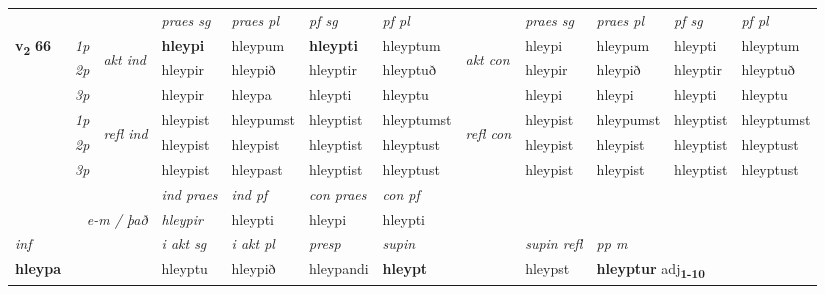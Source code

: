 \begin{longtable}[l]{X>{\footnotesize\itshape}llXXXXlXXXX}
 & &   & \textit{praes sg}  & \textit{praes pl}    & \textit{ pf sg} & \textit{pf pl} & & \textit{praes sg}  & \textit{praes pl}    & \textit{pf sg} & \textit{pf pl }  \\ \cmidrule{4-7} \cmidrule{9-12}
 \multirow{2}{*}{{{\textbf{v{\textsubscript{2}}} \Large{\textbf{66}}}}}  & 1p & \multirow{3}{*}{\begin{turn}{90}\textit{akt ind}\end{turn}} & \textbf{hleypi} & hleypum & \textbf{hleypti} & hleyptum & \multirow{3}{*}{\begin{turn}{90}\textit{akt con}\end{turn}} &hleypi & hleypum & hleypti & hleyptum\\*
 & 2p &  &  hleypir  & hleypið & hleyptir & hleyptuð & & hleypir & hleypið & hleyptir & hleyptuð \\*
 & 3p &  & hleypir & hleypa & hleypti & hleyptu & & hleypi & hleypi& hleypti & hleyptu \\*
\cmidrule{4-7} \cmidrule{9-12}
 & 1p & \multirow{3}{*}{\begin{turn}{90}\textit{refl ind}\end{turn}}  & hleypist & hleypumst & hleyptist & hleyptumst & \multirow{3}{*}{\begin{turn}{90}\textit{refl con}\end{turn}}  &hleypist & hleypumst & hleyptist & hleyptumst \\*
 & 2p &  & hleypist & hleypist & hleyptist & hleyptust & &hleypist & hleypist & hleyptist & hleyptust \\*
 & 3p  & & hleypist & hleypast & hleyptist & hleyptust & & hleypist & hleypist& hleyptist & hleyptust \\*
\cmidrule{4-7} \cmidrule{9-12}

   && &  \textit{ind praes} & \textit{ind pf} & \textit{con praes} & \textit{con pf} \\*
\multicolumn{3}{r}{\textit{e-m / það}} & hleypir & hleypti & hleypi & hleypti \\*

\cmidrule{4-7}
   {\textit{inf}} & &  & \textit{i akt sg} & \textit{i akt pl}   & \textit{presp} & \textit{supin} && \textit{supin refl} & \textit{pp m} \\*
  {\textbf{hleypa}} & && hleyptu  & hleypið   & hleypandi &  \textbf{hleypt} && hleypst & \multicolumn{2}{l}{\textbf{hleyptur} adj\textbf{\textsubscript{1-10}}} \\*

\midrule


\end{longtable}
